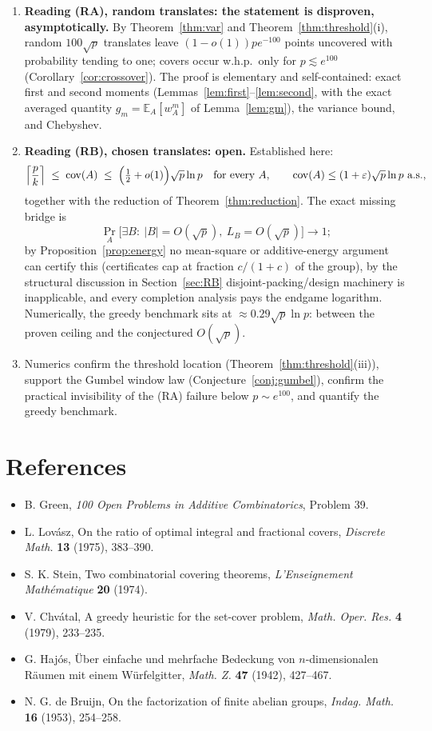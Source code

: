 \documentclass[11pt]{article}
\theoremstyle{definition}
\newcommand{\E}{\mathbb{E}}
\newcommand{\Prob}{\Pr}
\newcommand{\cov}{\operatorname{cov}}
\begin{document}
\begin{enumerate}
\item \textbf{Reading (RA), random translates: the statement is disproven,
asymptotically.} By Theorem~\ref{thm:var} and
Theorem~\ref{thm:threshold}(i), random $100\sqrt p$ translates leave
$(1-o(1))pe^{-100}$ points uncovered with probability tending to one; covers
occur w.h.p.\ only for $p\lesssim e^{100}$
(Corollary~\ref{cor:crossover}). The proof is elementary and
self-contained: exact first and second moments
(Lemmas~\ref{lem:first}--\ref{lem:second}, with the exact averaged quantity
$g_m=\E_A[w_A^m]$ of Lemma~\ref{lem:gm}), the variance bound, and Chebyshev.
\item \textbf{Reading (RB), chosen translates: open.} Established here:
\[
\Bigl\lceil\frac pk\Bigr\rceil\;\le\;\cov(A)\;\le\;
\Bigl(\tfrac12+o(1)\Bigr)\sqrt p\ln p \quad\text{for every }A,
\qquad
\cov(A)\le(1+\varepsilon)\sqrt p\ln p\ \text{a.s.},
\]
together with the reduction of Theorem~\ref{thm:reduction}. The exact missing
bridge is
\[
\Prob_A\bigl[\exists B:\ |B|=O(\sqrt p),\ L_B=O(\sqrt p)\bigr]\longrightarrow1 ;
\]
by Proposition~\ref{prop:energy} no mean-square or additive-energy argument
can certify this (certificates cap at fraction $c/(1+c)$ of the group), by the
structural discussion in Section~\ref{sec:RB} disjoint-packing/design
machinery is inapplicable, and every completion analysis pays the endgame
logarithm. Numerically, the greedy benchmark sits at
$\approx0.29\sqrt p\ln p$: between the proven ceiling and the conjectured
$O(\sqrt p)$.
\item Numerics confirm the threshold location
(Theorem~\ref{thm:threshold}(iii)), support the Gumbel window law
(Conjecture~\ref{conj:gumbel}), confirm the practical invisibility of the
(RA) failure below $p\sim e^{100}$, and quantify the greedy benchmark.
\end{enumerate}

\section*{References}
\begin{itemize}
\item B. Green, \emph{100 Open Problems in Additive Combinatorics}, Problem 39.
\item L. Lov\'asz, On the ratio of optimal integral and fractional covers,
\emph{Discrete Math.} \textbf{13} (1975), 383--390.
\item S. K. Stein, Two combinatorial covering theorems, \emph{L'Enseignement
Math\'ematique} \textbf{20} (1974).
\item V. Chv\'atal, A greedy heuristic for the set-cover problem,
\emph{Math. Oper. Res.} \textbf{4} (1979), 233--235.
\item G. Haj\'os, \"Uber einfache und mehrfache Bedeckung von
$n$-dimensionalen R\"aumen mit einem W\"urfelgitter, \emph{Math. Z.}
\textbf{47} (1942), 427--467.
\item N. G. de Bruijn, On the factorization of finite abelian groups,
\emph{Indag. Math.} \textbf{16} (1953), 254--258.
\end{itemize}
\end{document}
